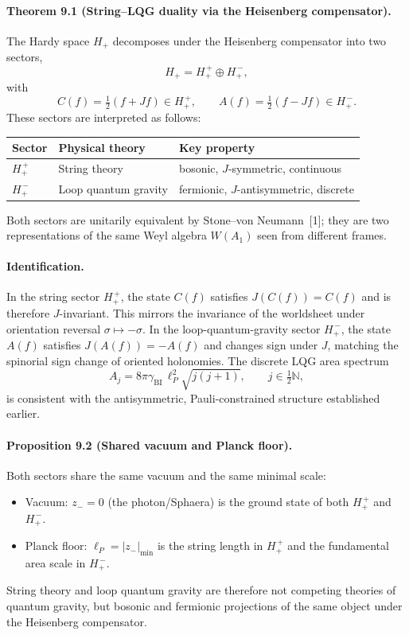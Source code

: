 \paragraph*{Theorem 9.1 (String--LQG duality via the Heisenberg compensator).}
The Hardy space $H_+$ decomposes under the Heisenberg compensator into two sectors,
\[
H_+ = H_+^{\,+} \oplus H_+^{\,-},
\]
with
\[
C(f)=\tfrac12(f+Jf) \in H_+^{\,+}, \qquad A(f)=\tfrac12(f-Jf) \in H_+^{\,-}.
\]
These sectors are interpreted as follows:
\begin{center}
\begin{tabular}{lll}
\toprule
Sector & Physical theory & Key property \\
\midrule
$H_+^{\,+}$ & String theory & bosonic, $J$-symmetric, continuous \\
$H_+^{\,-}$ & Loop quantum gravity & fermionic, $J$-antisymmetric, discrete \\
\bottomrule
\end{tabular}
\end{center}
Both sectors are unitarily equivalent by Stone--von Neumann~[1]; they are two representations of the same Weyl algebra $W(A_1)$ seen from different frames.

\paragraph*{Identification.}
In the string sector $H_+^{\,+}$, the state $C(f)$ satisfies $J(C(f))=C(f)$ and is therefore $J$-invariant. This mirrors the invariance of the worldsheet under orientation reversal $\sigma \mapsto -\sigma$. In the loop-quantum-gravity sector $H_+^{\,-}$, the state $A(f)$ satisfies $J(A(f))=-A(f)$ and changes sign under $J$, matching the spinorial sign change of oriented holonomies. The discrete LQG area spectrum
\[
A_j = 8\pi \gamma_{\mathrm{BI}} \, \ell_P^2 \sqrt{j(j+1)}, \qquad j \in \tfrac12\mathbb{N},
\]
is consistent with the antisymmetric, Pauli-constrained structure established earlier.

\paragraph*{Proposition 9.2 (Shared vacuum and Planck floor).}
Both sectors share the same vacuum and the same minimal scale:
\begin{itemize}
  \item Vacuum: $z_-=0$ (the photon/Sphaera) is the ground state of both $H_+^{\,+}$ and $H_+^{\,-}$.
  \item Planck floor: $\ell_P = |z_-|_{\min}$ is the string length in $H_+^{\,+}$ and the fundamental area scale in $H_+^{\,-}$.
\end{itemize}
String theory and loop quantum gravity are therefore not competing theories of quantum gravity, but bosonic and fermionic projections of the same object under the Heisenberg compensator.

